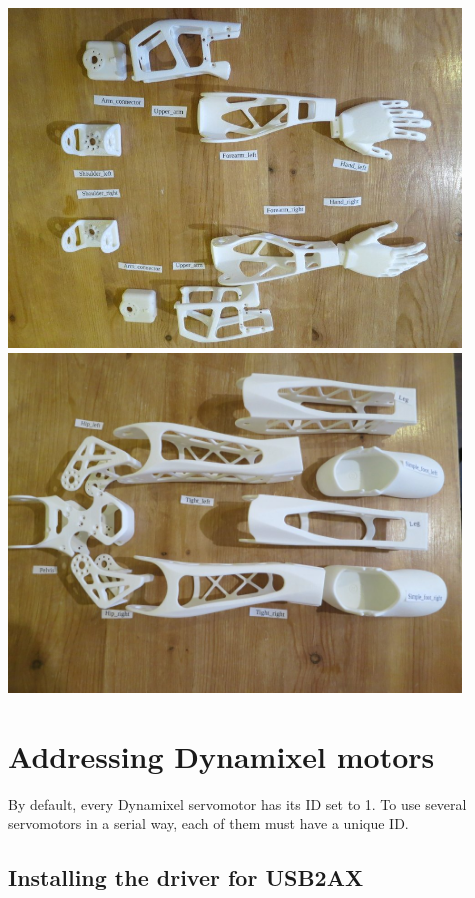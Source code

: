 \documentclass{article}
\begin{document}
\begin{center}
  \vspace{1mm}
  \includegraphics[width=0.9\textwidth]{parts_arms}\\
  \vspace{1mm}
  \includegraphics[width=0.9\textwidth]{parts_legs}
 \end{center}



\section{Addressing Dynamixel motors}
\label{addressing-poppys-motors}

By default, every Dynamixel servomotor has its ID set to 1. To use several servomotors in a serial way, each of them must have a unique ID.

\subsection{Installing the driver for USB2AX}
\end{document}
